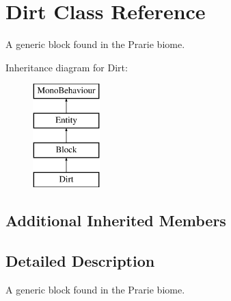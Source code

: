 \hypertarget{class_dirt}{}\section{Dirt Class Reference}
\label{class_dirt}


A generic block found in the Prarie biome.  


Inheritance diagram for Dirt\+:\begin{figure}[H]
\begin{center}
\leavevmode
\includegraphics[height=4.000000cm]{class_dirt}
\end{center}
\end{figure}
\subsection*{Additional Inherited Members}


\subsection{Detailed Description}
A generic block found in the Prarie biome. 

